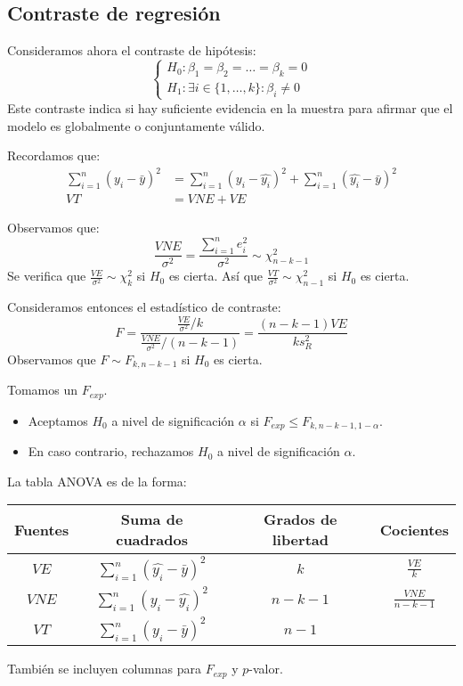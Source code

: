 \documentclass{report}
\theoremstyle{remark}
\theoremstyle{remark}
\theoremstyle{remark}
\theoremstyle{definition}
\theoremstyle{definition}
\theoremstyle{definition}
\begin{document}
\subsection*{Contraste de regresión}
Consideramos ahora el contraste de hipótesis:
$$\begin{cases}
        H_0: \beta_1 = \beta_2 = \dots = \beta_k = 0 \\
        H_1: \exists i \in \{1, \dots, k\} : \beta_i \neq 0
    \end{cases}$$
Este contraste indica si hay suficiente evidencia en la muestra para afirmar que el modelo es globalmente o conjuntamente válido.

Recordamos que:
\begin{align*}
    \sum_{i=1}^n (y_i - \bar{y})^2 & = \sum_{i=1}^n (y_i - \hat{y_i})^2 + \sum_{i=1}^n (\hat{y_i} - \bar{y})^2 \\
    VT                             & = VNE + VE
\end{align*}

Observamos que:
$$\frac{VNE}{\sigma^2} = \frac{\sum_{i=1}^n e_i^2}{\sigma^2} \sim \chi^2_{n-k-1}$$
Se verifica que $\frac{VE}{\sigma^2} \sim \chi^2_k$ si $H_0$ es cierta.
Así que $\frac{VT}{\sigma^2} \sim \chi^2_{n-1}$ si $H_0$ es cierta.

Consideramos entonces el estadístico de contraste:
$$F = \frac{\frac{VE}{\sigma^2} / k}{\frac{VNE}{\sigma^2} / (n-k-1)} = \frac{(n-k-1)VE}{ks_R^2}$$
Observamos que $F \sim F_{k, n-k-1}$ si $H_0$ es cierta.

Tomamos un $F_{exp}$.
\begin{itemize}
    \item Aceptamos $H_0$ a nivel de significación $\alpha$ si $F_{exp} \leq F_{k, n-k-1, 1-\alpha}$.
    \item En caso contrario, rechazamos $H_0$ a nivel de significación $\alpha$.
\end{itemize}

La tabla ANOVA es de la forma:
\begin{center}
    \begin{tabular}{ c | c | c | c }
        Fuentes & Suma de cuadrados                   & Grados de libertad & Cocientes           \\
        \hline
        $VE$    & $\sum_{i=1}^n(\hat{y_i}-\bar{y})^2$ & $k$                & $\frac{VE}{k}$      \\
        $VNE$   & $\sum_{i=1}^n(y_i - \hat{y_i})^2$   & $n-k-1$            & $\frac{VNE}{n-k-1}$ \\
        $VT$    & $\sum_{i=1}^n(y_i - \bar{y})^2$     & $n-1$
    \end{tabular}
\end{center}
También se incluyen columnas para $F_{exp}$ y $p$-valor.
\end{document}
